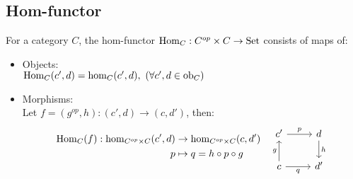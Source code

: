 \subsection*{Hom-functor}
For a category $C$, the hom-functor $\mathrm{Hom}_C : C^{op}\times C \to
\mathrm{Set}$ consists of maps of: \parencite{lane:working_mathematician}
\begin{itemize}
  \item Objects:\\
    $\mathrm{Hom}_C (c', d) = \hom_C (c', d),
      \ (\forall c', d\in \mathrm{ob}_C)$
  \item Morphisms:\\
    Let $f=(g^{op}, h): (c', d)\to (c, d')$, then:
    \[
      \begin{aligned}
        \Hom_C (f) : \hom_{C^{op}\times C}(c', d) &\to
          \hom_{C^{op}\times C}(c, d')\\
        p &\mapsto q = h\circ p\circ g
      \end{aligned}\quad
      \begin{tikzcd}
      {c'} & d \\
      c & {d'}
      \arrow["g", from=2-1, to=1-1]
      \arrow["h", from=1-2, to=2-2]
      \arrow["p", from=1-1, to=1-2]
      \arrow["q"', from=2-1, to=2-2]
      \end{tikzcd}
    \]
\end{itemize}